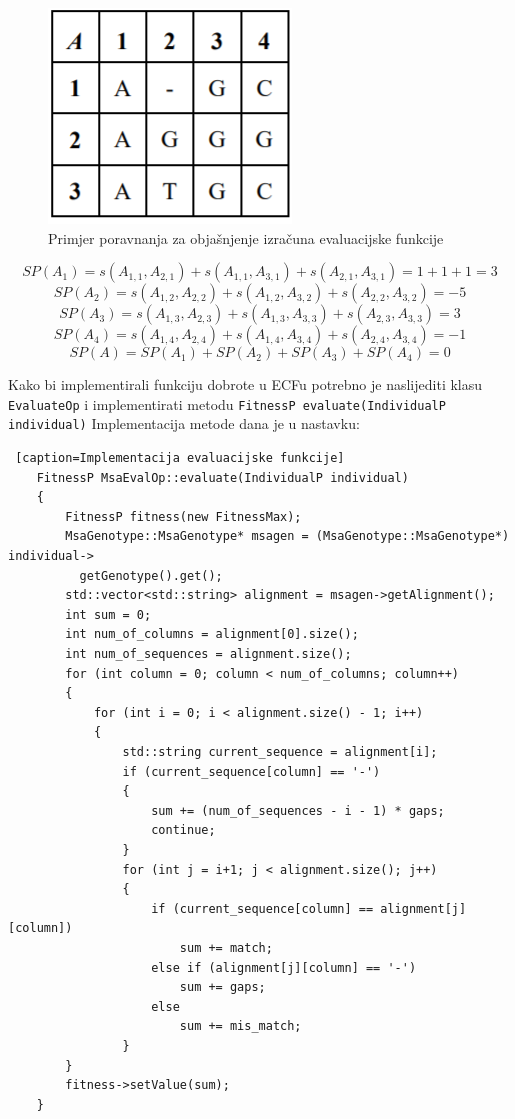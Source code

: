 \documentclass[times, utf8, zavrsni, numeric]{fer}
\begin{document}
\begin{figure}[h]
	\includegraphics[]{slike/tablicaEvaluacije.PNG}
	\centering
	\caption{Primjer poravnanja za objašnjenje izračuna evaluacijske funkcije}
	\label{fig:tablicaEvaluacije}
\end{figure}


\[SP(A_1) = s(A_{1,1}, A_{2,1}) + s(A_{1,1}, A_{3,1}) + s(A_{2,1},A_{3,1}) = 1 + 1 + 1 = 3\]
\[SP(A_2) = s(A_{1,2}, A_{2,2}) + s(A_{1,2}, A_{3,2}) + s(A_{2,2},A_{3,2}) = -5\]
\[SP(A_3) = s(A_{1,3}, A_{2,3}) + s(A_{1,3}, A_{3,3}) + s(A_{2,3},A_{3,3}) = 3\]
\[SP(A_4) = s(A_{1,4}, A_{2,4}) + s(A_{1,4}, A_{3,4}) + s(A_{2,4},A_{3,4}) = -1\]
\[SP(A) = SP(A_1) + SP(A_2) + SP(A_3) + SP(A_4) = 0\]

Kako bi implementirali funkciju dobrote u ECFu potrebno je naslijediti klasu \texttt{EvaluateOp} i implementirati metodu \texttt{FitnessP evaluate(IndividualP individual)}
 Implementacija metode dana je u nastavku:
 \begin{lstlisting} [caption=Implementacija evaluacijske funkcije]
 	FitnessP MsaEvalOp::evaluate(IndividualP individual)
 	{ 
 		FitnessP fitness(new FitnessMax);
 		MsaGenotype::MsaGenotype* msagen = (MsaGenotype::MsaGenotype*) individual->
 		  getGenotype().get();
 		std::vector<std::string> alignment = msagen->getAlignment();
 		int sum = 0;
 		int num_of_columns = alignment[0].size();
 		int num_of_sequences = alignment.size();
 		for (int column = 0; column < num_of_columns; column++)
 		{
 			for (int i = 0; i < alignment.size() - 1; i++)
 			{
 				std::string current_sequence = alignment[i];
 				if (current_sequence[column] == '-')
 				{
 					sum += (num_of_sequences - i - 1) * gaps;
 					continue;
 				}
 				for (int j = i+1; j < alignment.size(); j++)
 				{
 					if (current_sequence[column] == alignment[j][column])
 						sum += match;
 					else if (alignment[j][column] == '-')
 						sum += gaps;
 					else
 						sum += mis_match;
 				}
 		}
 		fitness->setValue(sum);
 	}
 \end{lstlisting}
  
\end{document}
